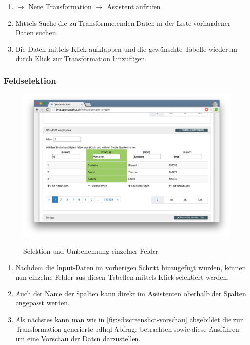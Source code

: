 \begin{enumerate}
\item {} $\to$ Neue Transformation $\to$ Assistent aufrufen
\item Mittels Suche die zu Transformierenden Daten in der Liste vorhandener Daten suchen.
\item Die Daten mittels Klick aufklappen und die gewünschte Tabelle wiederum durch Klick zur Transformation hinzufügen.
\end{enumerate}


\subsubsection{Feldselektion}

\begin{figure}[H]
	\centering
	\includegraphics[width=\linewidth]{fig/screenshot-felder-selektieren}
	\label{fig:sd:screenshot-tabelle-selektieren}
	\caption{Selektion und Umbenennung einzelner Felder}
\end{figure}

\begin{enumerate}
\item Nachdem die Input-Daten im vorherigen Schritt hinzugefügt wurden, können nun einzelne Felder aus diesen Tabellen mittels Klick selektiert werden.
\item Auch der Name der Spalten kann direkt im Assistenten oberhalb der Spalten angepasst werden.
\item Als nächstes kann man wie in \cref{fig:sd:screenshot-vorschau} abgebildet die zur Transformation generierte \acs{odhql}-Abfrage betrachten sowie diese Ausführen um eine Vorschau der Daten darzustellen.
\end{enumerate}

